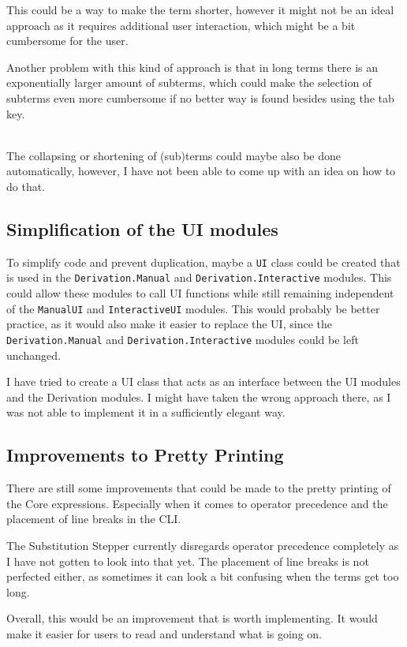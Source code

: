 This could be a way to make the term shorter,
however it might not be an ideal approach as it requires additional user interaction,
which might be a bit cumbersome for the user.

Another problem with this kind of approach is that in long terms there is an exponentially larger amount of subterms,
which could make the selection of subterms even more cumbersome if no better way is found besides using the tab key.

\ \\
The collapsing or shortening of (sub)terms could maybe also be done automatically,
however,
I have not been able to come up with an idea on how to do that.

\subsection{Simplification of the UI modules}
\label{subsect:UIInterface}
To simplify code and prevent duplication,
maybe a \texttt{UI} class could be created that is used in the \texttt{Derivation.Manual} and \texttt{Derivation.Interactive} modules.
This could allow these modules to call UI functions while still remaining independent of the \texttt{ManualUI} and \texttt{InteractiveUI} modules.
This would probably be better practice,
as it would also make it easier to replace the UI,
since the \texttt{Derivation.Manual} and \texttt{Derivation.Interactive} modules could be left unchanged.

I have tried to create a UI class that acts as an interface between the UI modules and the Derivation modules.
I might have taken the wrong approach there,
as I was not able to implement it in a sufficiently elegant way.

\subsection{Improvements to Pretty Printing}
There are still some improvements that could be made to the pretty printing of the Core expressions.
Especially when it comes to operator precedence and the placement of line breaks in the CLI.

The Substitution Stepper currently disregards operator precedence completely as I have not gotten to look into that yet.
The placement of line breaks is not perfected either,
as sometimes it can look a bit confusing when the terms get too long.

Overall, this would be an improvement that is worth implementing.
It would make it easier for users to read and understand what is going on.

